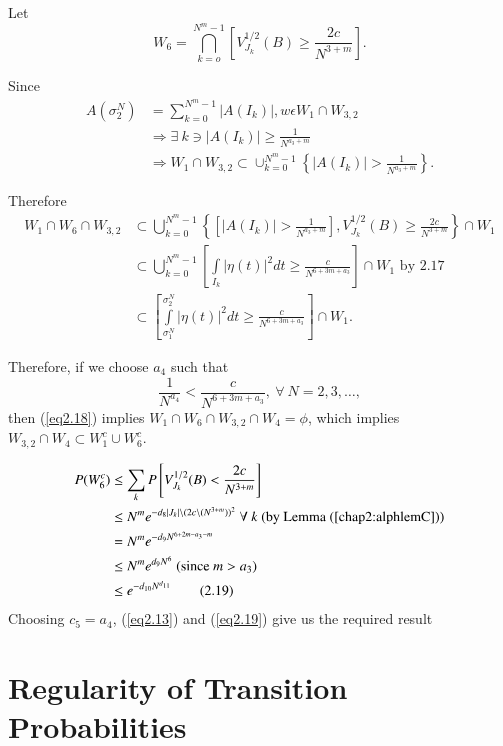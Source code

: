  Let
 $$
 W_6 = \bigcap_{k=o}^{N^{m}-1} \left[ V_{J_{k}}^{1/2} (B) \geq
   \frac{2c}{N^{3+m}}\right]. 
 $$

Since
\begin{align*}
  A(\sigma_{2}^{N}) &= \sum_{k=0}^{N^{m}-1} | A (I_k) |, w \epsilon
  W_1 \cap W_{3, 2}\\ 
  &\Rightarrow \exists~  k \ni  | A(I_k)| \geq \frac{1}{N^{a_{3} + m}} \\
  &\Rightarrow W_1  \cap W_{3, 2} \subset \cup_{k=0}^{N^{m}-1} \left\{ | A
  (I_k) | > \frac{1}{N^{a_{3}+m}} \right\}. 
 \end{align*}
 
 Therefore
 \begin{align*}
   W_1 \cap W_6  \cap W_{3, 2} & \subset \bigcup_{k=0}^{N^{m}-1}  \left\{\left[ |
     A (I_k)| > \frac{1}{N^{a_{3}+m}} \right], V_{J_{k}}^{1/2} (B) \geq
   \frac{2c}{N^{3+m}}\right\} \cap W_1\\ 
   & \subset \bigcup _{k=0}^{N^{m}-1} \left[ \int\limits_{I_{k}} | \eta (t) |^2 dt
     \geq \frac{c}{N^{6+3m+a_{3}}} \right] \cap W_1  \text{ by 2.17} \\
   & \subset \left[\int\limits_{\sigma _{1}^{N}}^{{\sigma _{2}^{N}}} | \eta
     (t) |^2 dt \geq \frac{c}{N^{6+3m+a_{3}}}\right]\cap
   W_1. \tag{2.18}\label{eq2.18}  
 \end{align*}
 
 Therefore, if we choose $a_4$ such that 
 $$
 \frac{1}{N^{a_{4}}} < \frac{c}{N^{6+3m+a_{3}}}, ~\forall~ N = 2, 3, \ldots,
 $$
 then (\ref{eq2.18}) implies $W_1 \cap W_6 \cap W_{3, 2} \cap W_4 = \phi$,
 which implies $W_{3, 2}  \cap W_4 \subset W_1 ^c \cup W_6^c$.

\begin{align*}
  P(W_6 ^c) &\leq \sum_{k} P \left[ V_{J_{k}}^{1/2} (B) <
    \frac{2c}{N^{3+m}}\right]\\ 
  &\leq N^m e^{-d_{8} | J_k| \backslash (2c \backslash (N^{3+m}))^2 }
  ~\forall~  k ~(\text{by Lemma (\ref{chap2:alphlemC})})\\ 
  & = N^m e^{-d_{9} N^{6+2m-a_{3}-m}}\\
  &\leq N^m e^{d_{9}N^{6}} ~(\text{since}~ m > a_3 )\\
  &\leq e^{-d_{10}N^{d_{11}}} \tag{2.19}\label{eq2.19}
\end{align*}\pageoriginale
Choosing $c_5 = a_4$, (\ref{eq2.13}) and (\ref{eq2.19}) give us the
required result 

\section{Regularity of Transition Probabilities}%


